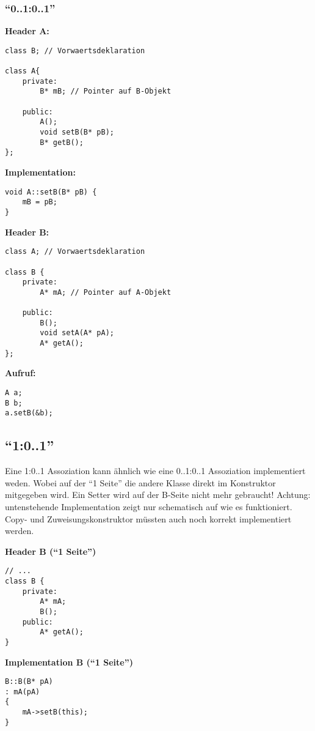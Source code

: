 \subsubsection{"`0..1:0..1"'}
\begin{multicols}{2}
\textbf{Header A:}
\begin{lstlisting}
class B; // Vorwaertsdeklaration

class A{
	private:
		B* mB; // Pointer auf B-Objekt
	
	public:
	    A();
		void setB(B* pB);
		B* getB();
};
\end{lstlisting}

\textbf{Implementation:}
\begin{lstlisting}
void A::setB(B* pB) {
	mB = pB;
}
\end{lstlisting}

\columnbreak

\textbf{Header B:}
\begin{lstlisting}
class A; // Vorwaertsdeklaration

class B {
	private: 
		A* mA; // Pointer auf A-Objekt
		
	public:
		B();
		void setA(A* pA);
		A* getA();
};
\end{lstlisting}

\textbf{Aufruf:}
\begin{lstlisting}
A a;
B b;
a.setB(&b);
\end{lstlisting}
\end{multicols}

\subsection{"`1:0..1"'}
Eine 1:0..1 Assoziation kann ähnlich wie eine 0..1:0..1 Assoziation
implementiert weden. Wobei auf der "`1 Seite"' die andere Klasse direkt im
Konstruktor mitgegeben wird. Ein Setter wird auf der B-Seite nicht mehr
gebraucht! Achtung: untenstehende Implementation zeigt nur schematisch auf wie
es funktioniert. Copy- und Zuweisungskonstruktor müssten auch noch korrekt
implementiert werden.
\begin{multicols}{2}
\textbf{Header B ("`1 Seite"')}
\begin{lstlisting}
// ...
class B {
	private:
		A* mA;
		B();
	public: 
		A* getA();		
}
\end{lstlisting}
\columnbreak
\textbf{Implementation B ("`1 Seite"')}
\begin{lstlisting}
B::B(B* pA)
: mA(pA)
{
	mA->setB(this);
}
\end{lstlisting}
\end{multicols}

